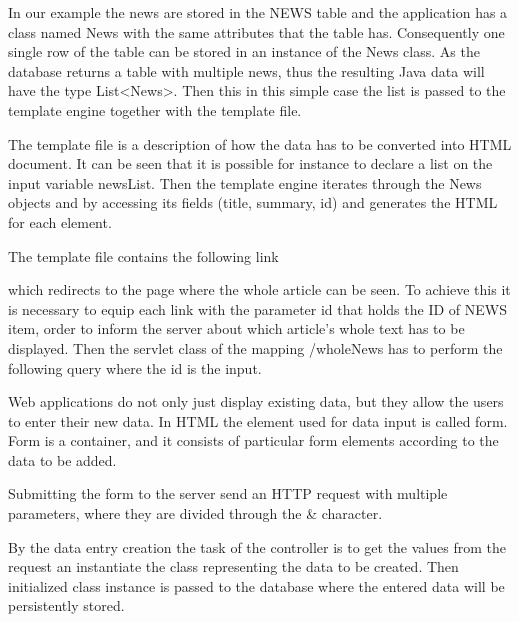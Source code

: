 
In our example the news are stored in the NEWS table and the application has a class named News with the same attributes that the table has.  Consequently one single row of the table can be stored in an instance of the News class. As the database returns a table with multiple news, thus the resulting Java data will have the type List<News>. Then this in this simple case the list is passed to the template engine together with the template file. 


The template file is a description of how the data has to be converted into HTML document. It can be seen that it is possible for instance to declare a list on the input variable newsList. Then the template engine iterates through the News objects and by accessing its fields (title, summary, id) and generates the HTML for each element. 

The template file contains the following link

\begin{center}
	\scriptsize{}
\end{center}

which redirects to the page where the whole article can be seen. To achieve this it is necessary to equip each link with the parameter id that holds the ID of NEWS item, order to inform the server about which article’s whole text has to be displayed. Then the servlet class of the mapping /wholeNews has to perform the following query where the id is the input.


Web applications do not only just display existing data, but they allow the users to enter their new data. In HTML the element used for data input is called form. Form is a container, and it consists of particular form elements according to the data to be added. 


Submitting the form to the server send an HTTP request with multiple parameters, where they are divided through the \& character.


By the data entry creation the task of the controller is to get the values from the request an instantiate the class representing the data to be created. Then initialized class instance is passed to the database where the entered data will be persistently stored.


